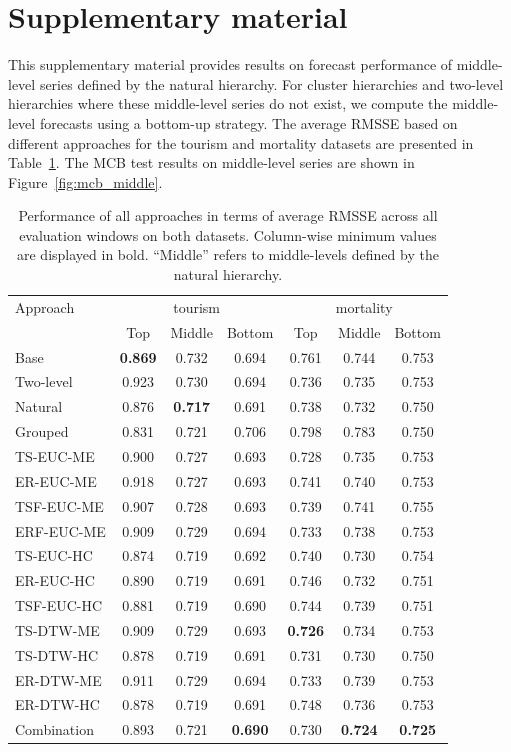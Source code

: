 \documentclass[12pt]{article}
\begin{document}
\section*{Supplementary material}


This supplementary material provides results on forecast performance of middle-level series defined by the natural hierarchy. For cluster hierarchies and two-level hierarchies where these middle-level series do not exist, we compute the middle-level forecasts using a bottom-up strategy. The average RMSSE based on different approaches for the tourism and mortality datasets are presented in Table~\ref{tab:P3_rmsse}. The MCB test results on middle-level series are shown in Figure~\ref{fig:mcb_middle}.\\



\begin{table}[!h]
\renewcommand\thetable{S.1}
    \centering
\caption{\label{tab:P3_rmsse}Performance of all approaches in terms of average RMSSE across all evaluation windows on both datasets. Column-wise minimum values are displayed in bold. ``Middle'' refers to middle-levels defined by the natural hierarchy. }
\vspace{0.1in}
\begin{tabular}{lcccccc}
\toprule
 Approach & \multicolumn{3}{c}{tourism} & \multicolumn{3}{c}{mortality} \\ 
 \cmidrule(lr){2-4} \cmidrule(lr){5-7}
 & Top & Middle & Bottom & Top & Middle & Bottom \\ \midrule
 Base & \textbf{0.869} & 0.732 & 0.694 & 0.761 & 0.744 & 0.753 \\
Two-level & 0.923 & 0.730 & 0.694 & 0.736 & 0.735 & 0.753 \\
Natural & 0.876 & \textbf{0.717} & 0.691 & 0.738 & 0.732 & 0.750 \\
Grouped & 0.831  & 0.721 & 0.706 & 0.798 & 0.783 & 0.750 \\
TS-EUC-ME & 0.900 & 0.727 & 0.693 & 0.728 & 0.735 & 0.753 \\
ER-EUC-ME & 0.918 & 0.727 & 0.693 & 0.741 & 0.740 & 0.753 \\
TSF-EUC-ME & 0.907 & 0.728 & 0.693 & 0.739 & 0.741 & 0.755 \\
ERF-EUC-ME & 0.909 & 0.729 & 0.694 & 0.733 & 0.738 & 0.753 \\
TS-EUC-HC & 0.874 & 0.719 & 0.692 & 0.740 & 0.730 & 0.754 \\
ER-EUC-HC & 0.890 & 0.719 & 0.691 & 0.746 & 0.732 & 0.751 \\
TSF-EUC-HC & 0.881 & 0.719 & 0.690 & 0.744 & 0.739 & 0.751 \\
TS-DTW-ME & 0.909 & 0.729 & 0.693 & \textbf{0.726} & 0.734 & 0.753 \\
TS-DTW-HC & 0.878 & 0.719 & 0.691 & 0.731 & 0.730 & 0.750 \\
ER-DTW-ME & 0.911 & 0.729 & 0.694 & 0.733 & 0.739 & 0.753 \\
ER-DTW-HC & 0.878 & 0.719 & 0.691 & 0.748 & 0.736 & 0.753 \\ 
Combination & 0.893 & 0.721 & \textbf{0.690} & 0.730 & \textbf{0.724} & \textbf{0.725} \\
\bottomrule\end{tabular}


\end{table}
\end{document}
